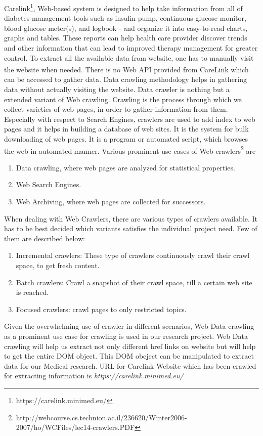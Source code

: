 \documentclass[article,type=msc,colorback,accentcolor=tud9c,twoside,11pt]{tudthesis}
\begin{document}
Carelink\footnote{https://carelink.minimed.eu/}, Web-based system is designed to help take information from all of diabetes management tools such as insulin pump, continuous glucose monitor, blood glucose meter(s), and logbook - and organize it into easy-to-read charts, graphs and tables. These reports can help health care provider discover trends and other information that can lead to improved therapy management for greater control. To extract all the available data from website, one has to manually visit the website when needed. There is no Web API provided from CareLink\textsuperscript{\textregistered} which can be accessed to gather data. Data crawling methodology helps in gathering data without actually visiting the website. Data crawler is nothing but a extended variant of Web crawling. Crawling is the process through which we collect varieties of web pages, in order to gather information from them. Especially with respect to Search Engines, crawlers are used to add index to web pages and it helps in building a database of web sites. It is the system for bulk downloading of web pages. It is a program or automated script, which browses the web in automated manner. Various prominent use cases of Web crawlers\footnote{http://webcourse.cs.technion.ac.il/236620/Winter2006-2007/ho/WCFiles/lec14-crawlers.PDF} are
\begin{enumerate}
\item	Data crawling, where web pages are analyzed for statistical properties.
\item	Web Search Engines.
\item	Web Archiving, where web pages are collected for successors.
\end{enumerate}
When dealing with Web Crawlers, there are various types of crawlers available. It has to be best decided which variants satisfies the individual project need. Few of them are described below:
\begin{enumerate}
\item	Incremental crawlers: These type of crawlers continuously crawl their crawl space, to get fresh content.
\item	Batch crawlers: Crawl a snapshot of their crawl space, till a certain web site is reached.
\item	Focused crawlers: crawl pages to only restricted topics.
\end{enumerate}
Given the overwhelming use of crawler in different scenarios, Web Data crawling as a prominent use case for crawling is used in our research project. Web Data crawling will help us extract not only different href links on website but will help to get the entire DOM object. This DOM obeject can be manipulated to extract data for our Medical research. URL for Carelink Website which has been crawled for extracting information is \textit{https://carelink.minimed.eu/}
\end{document}
